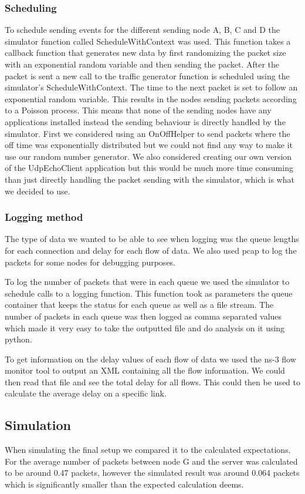 \documentclass{article}
\begin{document}
\subsubsection{Scheduling}
To schedule sending events for the different sending node A, B, C and D the simulator function called ScheduleWithContext was used.
This function takes a callback function that generates new data by first randomizing the packet size with an exponential random variable and then sending the packet.
After the packet is sent a new call to the traffic generator function is scheduled using the simulator's ScheduleWithContext.
The time to the next packet is set to follow an exponential random variable.
This results in the nodes sending packets according to a Poisson process.
This means that none of the sending nodes have any applications installed instead the sending behaviour is directly handled by the simulator.
First we considered using an OnOffHelper to send packets where the off time was exponentially distributed but we could not find any way to make it use our random number generator.
We also considered creating our own version of the UdpEchoClient application but this would be much more time consuming than just directly handling the packet sending with the simulator, which is what we decided to use.

\subsubsection{Logging method}
The type of data we wanted to be able to see when logging was the queue lengths for each connection and delay for each flow of data.
We also used pcap to log the packets for some nodes for debugging purposes.

To log the number of packets that were in each queue we used the simulator to schedule calls to a logging function.
This function took as parameters the queue container that keeps the status for each queue as well as a file stream.
The number of packets in each queue was then logged as comma separated values which made it very easy to take the outputted file and do analysis on it using python.

To get information on the delay values of each flow of data we used the ns-3 flow monitor tool to output an XML containing all the flow information.
We could then read that file and see the total delay for all flows.
This could then be used to calculate the average delay on a specific link.

\subsection{Simulation}
When simulating the final setup we compared it to the calculated expectations. For the average 
number of packets between node G and the server was calculated to be around 0.47 packets, 
however the simulated result was around 0.064 packets which is significantly smaller than the 
expected calculation deems. 
\end{document}
